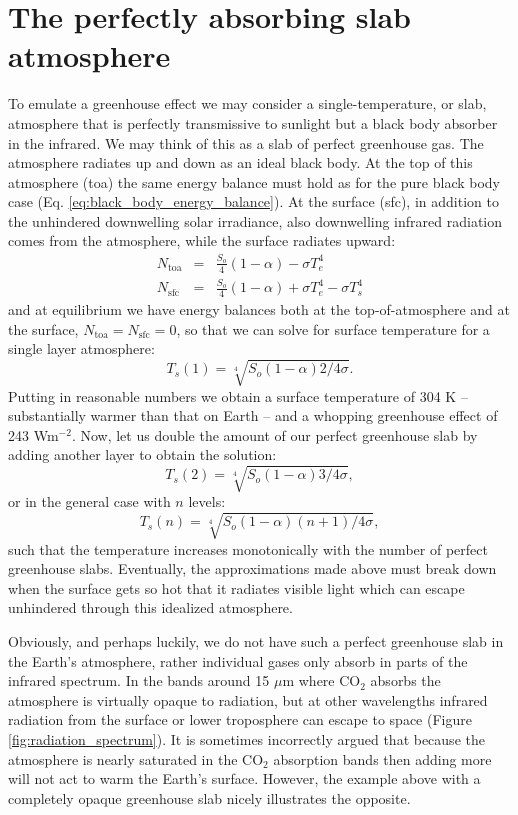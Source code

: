 \documentclass[12pt]{book}
\begin{document}
\section{The perfectly absorbing slab atmosphere}
To emulate a greenhouse effect we may consider a single-temperature, or slab, atmosphere that is perfectly transmissive to sunlight but a black body absorber in the infrared. We may think of this as a slab of perfect greenhouse gas. The atmosphere radiates up and down as an ideal black body. At the top of this atmosphere (toa) the same energy balance must hold as for the pure black body case (Eq. \ref{eq:black_body_energy_balance}). At the surface (sfc), in addition to the unhindered downwelling solar irradiance, also downwelling infrared radiation comes from the atmosphere, while the surface radiates upward: 
\begin{eqnarray}
N_\textrm{toa} &=&  \frac{S_o}{4}(1-\alpha) - \sigma T_e^4  \\ 
N_\textrm{sfc} &=&  \frac{S_o}{4}(1-\alpha) + \sigma T_e^4 - \sigma T_s^4  \nonumber
\label{eq:perfect_greenhouse}
\end{eqnarray}
and at equilibrium we have energy balances both at the top-of-atmosphere and at the surface, $N_\textrm{toa}=N_\textrm{sfc}=0$, so that we can solve for surface temperature for a single layer atmosphere:
\begin{equation}
T_s(1) = \sqrt[4]{S_o(1-\alpha)2/4\sigma}. 
\end{equation}
Putting in reasonable numbers we obtain a surface temperature of 304 K -- substantially warmer than that on Earth -- and a whopping greenhouse effect of 243 Wm$^{-2}$. Now, let us double the amount of our perfect greenhouse slab by adding another layer to obtain the solution:
\begin{equation}
T_s(2) = \sqrt[4]{S_o(1-\alpha)3/4\sigma},
\label{eq:ntwo}
\end{equation}
or in the general case with $n$ levels:
\begin{equation}
T_s(n) = \sqrt[4]{S_o(1-\alpha)(n+1)/4\sigma},
\end{equation}
such that the temperature increases monotonically with the number of perfect greenhouse slabs. Eventually, the approximations made above must break down when the surface gets so hot that it radiates visible light which can escape unhindered through this idealized atmosphere. 

Obviously, and perhaps luckily, we do not have such a perfect greenhouse slab in the Earth's atmosphere, rather individual gases only absorb in parts of the infrared spectrum. In the bands around 15 $\mu$m where CO$_2$ absorbs the atmosphere is virtually opaque to radiation, but at other wavelengths infrared radiation from the surface or lower troposphere can escape to space (Figure \ref{fig:radiation_spectrum}). It is sometimes incorrectly argued that because the atmosphere is nearly saturated in the CO$_2$ absorption bands then adding more will not act to warm the Earth's surface. However, the example above with a completely opaque greenhouse slab nicely illustrates the opposite.
\end{document}
